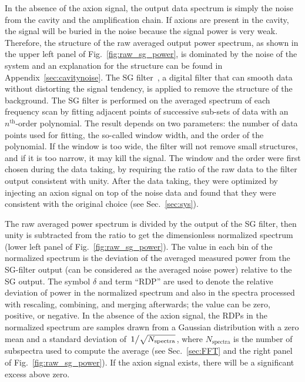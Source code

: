 In the absence of the axion signal, the output data spectrum is simply the 
noise from the cavity and the amplification chain. If axions are present 
in the cavity, the signal will be buried in the noise because the 
signal power is very weak. Therefore, the structure of the raw averaged 
output power spectrum, as shown in the upper left panel of 
Fig.~\ref{fig:raw_sg_power}, is dominated 
by the noise of the system and an explanation for the structure can be found 
in Appendix~\ref{sec:cavitynoise}. The SG 
filter~\cite{SGFilter}, a digital filter that can smooth data without 
distorting the signal tendency, is applied to remove the structure of the  
background. The SG filter is performed on the averaged spectrum of each 
frequency scan by fitting adjacent points of successive sub-sets of data with 
an $n^\text{th}$-order polynomial. The result depends on two parameters: 
the number of 
data points used for fitting, the so-called window width, and the order of 
the polynomial. If the window is too wide, the filter will not remove small 
structures, and if it is too narrow, it may kill the signal. 
The window and the order were first chosen during the data taking, by 
requiring the ratio of the raw data to the filter 
output consistent with unity.  
After the data taking, they were optimized by injecting an axion signal on 
top of 
the noise data and found that they were consistent with the original choice 
(see Sec.~\ref{sec:sys}). 

The raw averaged power spectrum is divided by the output of the SG filter, 
then unity is subtracted from the ratio to get the dimensionless 
normalized spectrum (lower left panel of Fig.~\ref{fig:raw_sg_power}). The value 
in each bin of the normalized spectrum is the deviation of the 
averaged measured power from the SG-filter output (can be considered 
as the averaged noise power) relative to the SG output. The symbol 
$\delta$ and term ``RDP'' are used to denote the relative deviation of power 
in the normalized spectrum and also in the spectra processed with rescaling, 
combining, and merging afterwards; the value can be zero, positive, or negative. 
In the absence of the axion signal, the RDPs in the normalized spectrum are 
samples drawn from a Gaussian 
distribution with a zero mean and a standard deviation of 
$\left.1\middle/\sqrt{N_\text{spectra}}\right.$, where $N_\text{spectra}$ is 
the number of subspectra used to compute the average (see Sec.~\ref{sec:FFT} 
and the right panel of Fig.~\ref{fig:raw_sg_power}). 
If the axion signal exists, there will be a significant excess above zero. 
 
